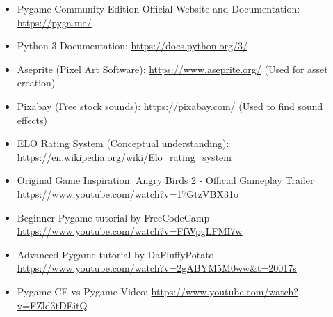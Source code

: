 \documentclass[11pt, a4paper]{article}
\begin{document}
\begin{itemize}

    \item Pygame Community Edition Official Website and Documentation: \href{https://pyga.me/}{https://pyga.me/}
    
    \item Python 3 Documentation: \href{https://docs.python.org/3/}{https://docs.python.org/3/}
    
    \item Aseprite (Pixel Art Software): \href{https://www.aseprite.org/}{https://www.aseprite.org/} (Used for asset creation)
    
    \item Pixabay (Free stock sounds): \href{https://pixabay.com/}{https://pixabay.com/} (Used to find sound effects)
    
    \item ELO Rating System (Conceptual understanding): \href{https://en.wikipedia.org/wiki/Elo_rating_system}{https://en.wikipedia.org/wiki/Elo\_rating\_system}
    
    \item Original Game Inspiration: Angry Birds 2 - Official Gameplay Trailer \url{https://www.youtube.com/watch?v=17GtzVBX31o}
    
    \item Beginner Pygame tutorial by FreeCodeCamp \url{https://www.youtube.com/watch?v=FfWpgLFMI7w}
    
    \item Advanced Pygame tutorial by DaFluffyPotato \url{https://www.youtube.com/watch?v=2gABYM5M0ww&t=20017s}
    
    \item Pygame CE vs Pygame Video: \url{https://www.youtube.com/watch?v=FZld3tDEitQ}

\end{itemize}
\end{document}
